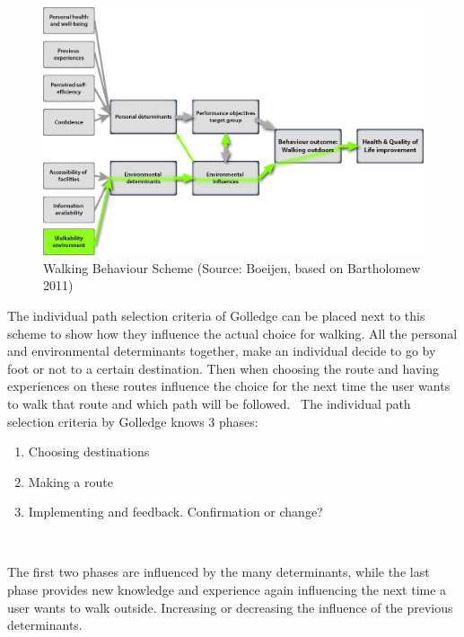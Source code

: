\begin{figure}[h]
\includegraphics[width=\textwidth]{img/B_Behaviour_Scheme.jpg}
\centering
\caption[Walking Behaviour Scheme]{Walking Behaviour Scheme (Source: Boeijen, based on Bartholomew 2011)
\label{behaviour}}
\end{figure}

The individual path selection criteria of Golledge can be placed next to  this scheme to show how they influence the actual choice for walking. All the personal and environmental determinants together, make an individual decide to go by foot or not to a certain destination. Then when choosing the route and having experiences on these routes influence the choice for the next time the user wants to walk that route and which path will be followed.~\cite{Golledge2002} The individual path selection criteria by Golledge knows 3 phases: 

\begin{enumerate}
\item Choosing destinations 
\item Making a route 
\item Implementing and feedback. Confirmation or change?
\end{enumerate}  ~\cite{Golledge2002}

The first two phases are influenced by the many determinants, while the last phase provides new knowledge and experience again influencing the next time a user wants to walk outside. Increasing or decreasing the influence of the previous determinants. 


